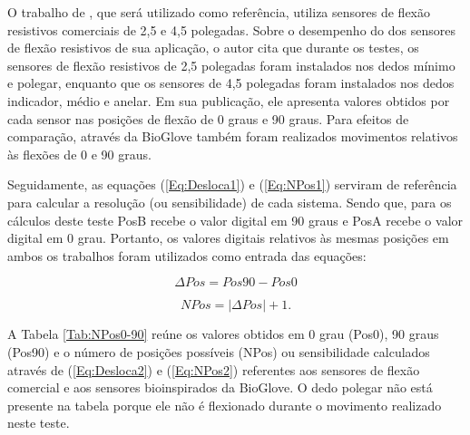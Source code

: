 \documentclass[
	12pt,				%
	openright,			%
	oneside,			%
	a4paper,			%
	english,			%
	brazil				%
	]{abntex2}
\begin{document}
	
		O trabalho de \cite{anbarasi2013deafmute}, que será utilizado como referência, utiliza sensores de flexão resistivos comerciais de 2,5 e 4,5 polegadas. Sobre o desempenho do dos sensores de flexão resistivos de sua aplicação, o autor cita que durante os testes, os sensores de flexão resistivos de 2,5 polegadas foram instalados nos dedos mínimo e polegar, enquanto que os sensores de 4,5 polegadas foram instalados nos dedos indicador, médio e anelar. Em sua publicação, ele apresenta valores obtidos por cada sensor nas posições de flexão de 0 graus e 90 graus. Para efeitos de comparação, através da BioGlove também foram realizados movimentos relativos às flexões de 0 e 90 graus. 
		
		Seguidamente, as equações (\ref{Eq:Desloca1}) e (\ref{Eq:NPos1}) serviram de referência para calcular a resolução (ou sensibilidade) de cada sistema. Sendo que, para os cálculos deste teste PosB recebe o valor digital em 90 graus e PosA recebe o valor digital em 0 grau. Portanto, os valores digitais relativos às mesmas posições em ambos os trabalhos foram utilizados como entrada das equações: 
		
	\begin{equation}
			\Delta Pos 	= Pos 90 	- 	Pos 0
		\label{Eq:Desloca2}
	\end{equation}


	\begin{equation}
			NPos = |\Delta Pos| + 1 .
		\label{Eq:NPos2}
	\end{equation}


		A Tabela \ref{Tab:NPos0-90} reúne os valores obtidos em 0 grau (Pos0), 90 graus (Pos90) e o número de posições possíveis (NPos) ou sensibilidade calculados através de (\ref{Eq:Desloca2}) e (\ref{Eq:NPos2}) referentes aos sensores de flexão comercial e aos sensores bioinspirados da BioGlove. O dedo polegar não está presente na tabela porque ele não é flexionado durante o movimento realizado neste teste.
		
\end{document}
